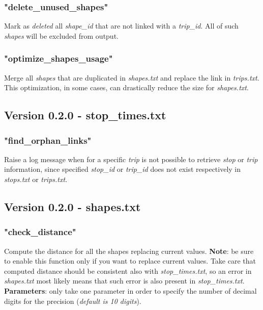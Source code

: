 \documentclass[12pt, a4paper]{book}
\begin{document}
\subsubsection{"delete\_unused\_shapes"}
\begin{justify}
Mark as \textit{deleted} all \textit{shape\_id} that are not linked with a \textit{trip\_id}. All of such \textit{shapes} will be excluded from output.
\end{justify}


\subsubsection{"optimize\_shapes\_usage"}
\begin{justify}
Merge all \textit{shapes} that are duplicated in \textit{shapes.txt} and replace the link in \textit{trips.txt}. This optimization, in some cases, can drastically reduce the size for \textit{shapes.txt}.
\end{justify}


\subsection{Version 0.2.0 - stop\_times.txt}

\subsubsection{"find\_orphan\_links"}
\begin{justify}
Raise a log message when for a specific \textit{trip} is not possible to retrieve \textit{stop} or \textit{trip} information, since specified \textit{stop\_id} or \textit{trip\_id} does not exist respectively in \textit{stops.txt} or \textit{trips.txt}.
\end{justify}


\subsection{Version 0.2.0 - shapes.txt}

\subsubsection{"check\_distance"}
\begin{justify}
Compute the distance for all the shapes replacing current values.\newline\newline
\textbf{Note}: be sure to enable this function only if you want to replace current values.
Take care that computed distance should be consistent also with \textit{stop\_times.txt}, so an error in \textit{shapes.txt} most likely means that such error is also present in \textit{stop\_times.txt}.\newline\newline
\textbf{Parameters}: only take one parameter in order to specify the number of decimal digits for the precision (\textit{default is 10 digits}).

\end{justify}
\end{document}
